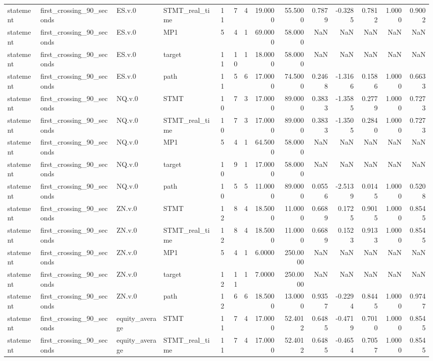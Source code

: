 \begin{tabular}{llllrrrrrrrrrr}
statement & first_crossing_90_seconds & ES.v.0 & STMT_real_time & 11 & 7 & 4 & 19.0000 & 55.5000 & 0.7879 & -0.3285 & 0.7812 & 1.0000 & 0.9002 \\
statement & first_crossing_90_seconds & ES.v.0 & MP1 & 5 & 4 & 1 & 69.0000 & 58.0000 & NaN & NaN & NaN & NaN & NaN \\
statement & first_crossing_90_seconds & ES.v.0 & target & 11 & 10 & 1 & 18.0000 & 58.0000 & NaN & NaN & NaN & NaN & NaN \\
statement & first_crossing_90_seconds & ES.v.0 & path & 11 & 5 & 6 & 17.0000 & 74.5000 & 0.2468 & -1.3166 & 0.1586 & 1.0000 & 0.6633 \\
statement & first_crossing_90_seconds & NQ.v.0 & STMT & 10 & 7 & 3 & 17.0000 & 89.0000 & 0.3833 & -1.3585 & 0.2779 & 1.0000 & 0.7273 \\
statement & first_crossing_90_seconds & NQ.v.0 & STMT_real_time & 10 & 7 & 3 & 17.0000 & 89.0000 & 0.3833 & -1.3505 & 0.2840 & 1.0000 & 0.7273 \\
statement & first_crossing_90_seconds & NQ.v.0 & MP1 & 5 & 4 & 1 & 64.5000 & 58.0000 & NaN & NaN & NaN & NaN & NaN \\
statement & first_crossing_90_seconds & NQ.v.0 & target & 10 & 9 & 1 & 17.0000 & 58.0000 & NaN & NaN & NaN & NaN & NaN \\
statement & first_crossing_90_seconds & NQ.v.0 & path & 10 & 5 & 5 & 11.0000 & 89.0000 & 0.0556 & -2.5139 & 0.0145 & 1.0000 & 0.5208 \\
statement & first_crossing_90_seconds & ZN.v.0 & STMT & 12 & 8 & 4 & 18.5000 & 11.0000 & 0.6689 & 0.1725 & 0.9015 & 1.0000 & 0.8545 \\
statement & first_crossing_90_seconds & ZN.v.0 & STMT_real_time & 12 & 8 & 4 & 18.5000 & 11.0000 & 0.6689 & 0.1523 & 0.9133 & 1.0000 & 0.8545 \\
statement & first_crossing_90_seconds & ZN.v.0 & MP1 & 5 & 4 & 1 & 6.0000 & 250.0000 & NaN & NaN & NaN & NaN & NaN \\
statement & first_crossing_90_seconds & ZN.v.0 & target & 12 & 11 & 1 & 7.0000 & 250.0000 & NaN & NaN & NaN & NaN & NaN \\
statement & first_crossing_90_seconds & ZN.v.0 & path & 12 & 6 & 6 & 18.5000 & 13.0000 & 0.9357 & -0.2294 & 0.8445 & 1.0000 & 0.9747 \\
statement & first_crossing_90_seconds & equity_average & STMT & 11 & 7 & 4 & 17.0000 & 52.4012 & 0.6485 & -0.4719 & 0.7010 & 1.0000 & 0.8545 \\
statement & first_crossing_90_seconds & equity_average & STMT_real_time & 11 & 7 & 4 & 17.0000 & 52.4012 & 0.6485 & -0.4654 & 0.7057 & 1.0000 & 0.8545 \\

\end{tabular}
